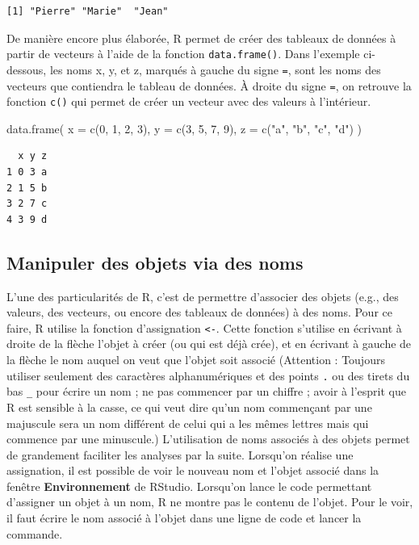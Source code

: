 \documentclass[
  letterpaper,
]{book}
\newenvironment{Shaded}{\begin{snugshade}}{\end{snugshade}}
\newcommand{\AttributeTok}[1]{\textcolor[rgb]{0.40,0.45,0.13}{#1}}
\newcommand{\DecValTok}[1]{\textcolor[rgb]{0.68,0.00,0.00}{#1}}
\newcommand{\FunctionTok}[1]{\textcolor[rgb]{0.28,0.35,0.67}{#1}}
\newcommand{\NormalTok}[1]{\textcolor[rgb]{0.00,0.23,0.31}{#1}}
\newcommand{\StringTok}[1]{\textcolor[rgb]{0.13,0.47,0.30}{#1}}
\begin{document}
\begin{verbatim}
[1] "Pierre" "Marie"  "Jean"  
\end{verbatim}

De manière encore plus élaborée, R permet de créer des tableaux de
données à partir de vecteurs à l'aide de la fonction
\texttt{data.frame()}. Dans l'exemple ci-dessous, les noms x, y, et z,
marqués à gauche du signe \texttt{=}, sont les noms des vecteurs que
contiendra le tableau de données. À droite du signe \texttt{=}, on
retrouve la fonction \texttt{c()} qui permet de créer un vecteur avec
des valeurs à l'intérieur.

\begin{Shaded}
\begin{Highlighting}[]
\FunctionTok{data.frame}\NormalTok{(}
  \AttributeTok{x =} \FunctionTok{c}\NormalTok{(}\DecValTok{0}\NormalTok{, }\DecValTok{1}\NormalTok{, }\DecValTok{2}\NormalTok{, }\DecValTok{3}\NormalTok{),}
  \AttributeTok{y =} \FunctionTok{c}\NormalTok{(}\DecValTok{3}\NormalTok{, }\DecValTok{5}\NormalTok{, }\DecValTok{7}\NormalTok{, }\DecValTok{9}\NormalTok{),}
  \AttributeTok{z =} \FunctionTok{c}\NormalTok{(}\StringTok{"a"}\NormalTok{, }\StringTok{"b"}\NormalTok{, }\StringTok{"c"}\NormalTok{, }\StringTok{"d"}\NormalTok{)}
\NormalTok{)}
\end{Highlighting}
\end{Shaded}

\begin{verbatim}
  x y z
1 0 3 a
2 1 5 b
3 2 7 c
4 3 9 d
\end{verbatim}

\subsection{Manipuler des objets via des
noms}\label{manipuler-des-objets-via-des-noms}

L'une des particularités de R, c'est de permettre d'associer des objets
(e.g., des valeurs, des vecteurs, ou encore des tableaux de données) à
des noms. Pour ce faire, R utilise la fonction d'assignation
\texttt{\textless{}-}. Cette fonction s'utilise en écrivant à droite de
la flèche l'objet à créer (ou qui est déjà crée), et en écrivant à
gauche de la flèche le nom auquel on veut que l'objet soit associé
(Attention : Toujours utiliser seulement des caractères alphanumériques
et des points \texttt{.} ou des tirets du bas \texttt{\_} pour écrire un
nom ; ne pas commencer par un chiffre ; avoir à l'esprit que R est
sensible à la casse, ce qui veut dire qu'un nom commençant par une
majuscule sera un nom différent de celui qui a les mêmes lettres mais
qui commence par une minuscule.) L'utilisation de noms associés à des
objets permet de grandement faciliter les analyses par la suite.
Lorsqu'on réalise une assignation, il est possible de voir le nouveau
nom et l'objet associé dans la fenêtre \textbf{Environnement} de
RStudio. Lorsqu'on lance le code permettant d'assigner un objet à un
nom, R ne montre pas le contenu de l'objet. Pour le voir, il faut écrire
le nom associé à l'objet dans une ligne de code et lancer la commande.
\end{document}
